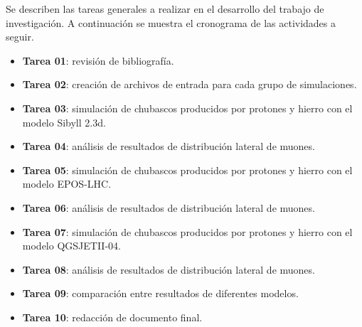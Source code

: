 Se describen las tareas generales a realizar en el desarrollo del trabajo de investigaci\'on. A continuaci\'on se muestra el cronograma de las actividades a seguir.

\begin{itemize}
\item \textbf{Tarea 01}: revisión de bibliografía.
	
\item \textbf{Tarea 02}: creación de archivos de entrada para cada grupo de simulaciones.

\item \textbf{Tarea 03}: simulación de chubascos producidos por protones y hierro con el modelo Sibyll 2.3d.

\item \textbf{Tarea 04}: análisis de resultados de distribuci\'on lateral de muones.

\item \textbf{Tarea 05}: simulación de chubascos producidos por protones y hierro con el modelo EPOS-LHC.

\item \textbf{Tarea 06}: análisis de resultados de distribuci\'on lateral de muones.

\item \textbf{Tarea 07}: simulación de chubascos producidos por protones y hierro con el modelo QGSJETII-04.

\item \textbf{Tarea 08}: análisis de resultados de distribuci\'on lateral de muones.

\item \textbf{Tarea 09}: comparación entre resultados de diferentes modelos.

\item \textbf{Tarea 10}: redacción de documento final.
\end{itemize}

